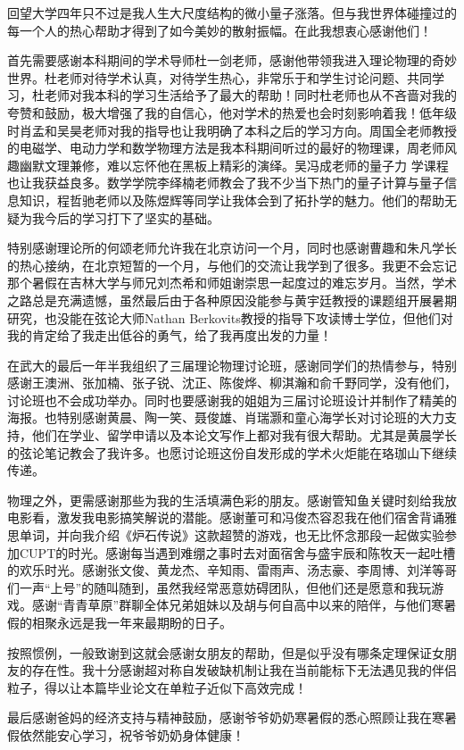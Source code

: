 \begin{acknowledgements}
	回望大学四年只不过是我人生大尺度结构的微小量子涨落。但与我世界体碰撞过的每一个人的热心帮助才得到了如今美妙的散射振幅。在此我想衷心感谢他们！
	
	首先需要感谢本科期间的学术导师杜一剑老师，感谢他带领我进入理论物理的奇妙世界。杜老师对待学术认真，对待学生热心，非常乐于和学生讨论问题、共同学习，杜老师对我本科的学习生活给予了最大的帮助！同时杜老师也从不吝啬对我的夸赞和鼓励，极大增强了我的自信心，他对学术的热爱也会时刻影响着我！低年级时肖孟和吴昊老师对我的指导也让我明确了本科之后的学习方向。周国全老师教授的电磁学、电动力学和数学物理方法是我本科期间听过的最好的物理课，周老师风趣幽默文理兼修，难以忘怀他在黑板上精彩的演绎。吴冯成老师的量子力 学课程也让我获益良多。数学学院李绎楠老师教会了我不少当下热门的量子计算与量子信息知识，程哲驰老师以及陈煜辉等同学让我体会到了拓扑学的魅力。他们的帮助无疑为我今后的学习打下了坚实的基础。
	
	特别感谢理论所的何颂老师允许我在北京访问一个月，同时也感谢曹趣和朱凡学长的热心接纳，在北京短暂的一个月，与他们的交流让我学到了很多。我更不会忘记那个暑假在吉林大学与师兄刘杰希和师姐谢崇思一起度过的难忘岁月。当然，学术之路总是充满遗憾，虽然最后由于各种原因没能参与黄宇廷教授的课题组开展暑期研究，也没能在弦论大师Nathan Berkovits教授的指导下攻读博士学位，但他们对我的肯定给了我走出低谷的勇气，给了我再度出发的力量！
	
	在武大的最后一年半我组织了三届理论物理讨论班，感谢同学们的热情参与，特别感谢王澳洲、张加楠、张子锐、沈正、陈俊烨、柳淇瀚和俞千野同学，没有他们，讨论班也不会成功举办。同时也要感谢我的姐姐为三届讨论班设计并制作了精美的海报。也特别感谢黄晨、陶一笑、聂俊雄、肖瑞灏和童心海学长对讨论班的大力支持，他们在学业、留学申请以及本论文写作上都对我有很大帮助。尤其是黄晨学长的弦论笔记教会了我许多。也愿讨论班这份自发形成的学术火炬能在珞珈山下继续传递。
	
	物理之外，更需感谢那些为我的生活填满色彩的朋友。感谢管知鱼关键时刻给我放电影看，激发我电影搞笑解说的潜能。感谢董可和冯俊杰容忍我在他们宿舍背诵雅思单词，并向我介绍《炉石传说》这款超赞的游戏，也无比怀念那段一起做实验参加CUPT的时光。感谢每当遇到难绷之事时去对面宿舍与盛宇辰和陈牧天一起吐槽的欢乐时光。感谢张文俊、黄龙杰、辛知雨、雷雨声、汤志豪、李周博、刘洋等哥们一声“上号”的随叫随到，虽然我经常恶意妨碍团队，但他们还是愿意和我玩游戏。感谢“青青草原”群聊全体兄弟姐妹以及胡与何自高中以来的陪伴，与他们寒暑假的相聚永远是我一年来最期盼的日子。
	
	按照惯例，一般致谢到这就会感谢女朋友的帮助，但是似乎没有哪条定理保证女朋友的存在性。我十分感谢超对称自发破缺机制让我在当前能标下无法遇见我的伴侣粒子，得以让本篇毕业论文在单粒子近似下高效完成！
	
	最后感谢爸妈的经济支持与精神鼓励，感谢爷爷奶奶寒暑假的悉心照顾让我在寒暑假依然能安心学习，祝爷爷奶奶身体健康！
\end{acknowledgements}

